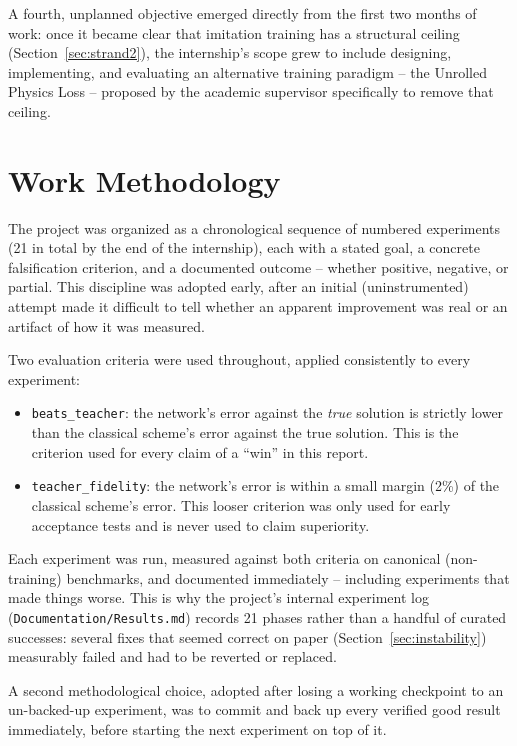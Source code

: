 \documentclass[11pt]{article}
\begin{document}
A fourth, unplanned objective emerged directly from the first two months of
work: once it became clear that imitation training has a structural ceiling
(Section~\ref{sec:strand2}), the internship's scope grew to include
designing, implementing, and evaluating an alternative training paradigm --
the Unrolled Physics Loss -- proposed by the academic supervisor
specifically to remove that ceiling.

\section{Work Methodology}

The project was organized as a chronological sequence of numbered
experiments (21 in total by the end of the internship), each with a stated
goal, a concrete falsification criterion, and a documented outcome --
whether positive, negative, or partial. This discipline was adopted early,
after an initial (uninstrumented) attempt made it difficult to tell whether
an apparent improvement was real or an artifact of how it was measured.

Two evaluation criteria were used throughout, applied consistently to
every experiment:

\begin{itemize}
    \item \texttt{beats\_teacher}: the network's error against the
    \emph{true} solution is strictly lower than the classical scheme's
    error against the true solution. This is the criterion used for every
    claim of a ``win'' in this report.
    \item \texttt{teacher\_fidelity}: the network's error is within a
    small margin (2\%) of the classical scheme's error. This looser
    criterion was only used for early acceptance tests and is never used to
    claim superiority.
\end{itemize}

Each experiment was run, measured against both criteria on canonical
(non-training) benchmarks, and documented immediately -- including
experiments that made things worse. This is why the project's internal
experiment log (\texttt{Documentation/Results.md}) records 21 phases rather
than a handful of curated successes: several fixes that seemed correct on
paper (Section~\ref{sec:instability}) measurably failed and had to be
reverted or replaced.

A second methodological choice, adopted after losing a working checkpoint
to an un-backed-up experiment, was to commit and back up every verified
good result immediately, before starting the next experiment on top of it.
\end{document}
